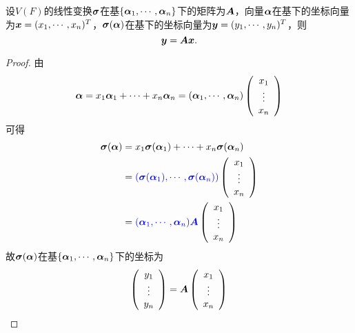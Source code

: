 \begin{frame}
  \begin{dingli}
    设$V(F)$的线性变换$\boldsymbol{\sigma}$在基$\{\boldsymbol{\alpha}_1,\cdots,\boldsymbol{\alpha}_n\}$下的矩阵为$\boldsymbol{A}$，向量$\boldsymbol{\alpha}$在基下的坐标向量为${\boldsymbol{x}}=(x_1,\cdots,x_n)^T$，$\boldsymbol{\sigma}(\boldsymbol{\alpha})$在基下的坐标向量为${\boldsymbol{y}}=(y_1,\cdots,y_n)^T$，则
    $$
    {\boldsymbol{y}}=\boldsymbol{A}{\boldsymbol{x}}.
    $$
  \end{dingli} \vspace{.1in} \pause 

  \begin{proof}
    由
    $$
    \boldsymbol{\alpha}=x_1\boldsymbol{\alpha}_1+\cdots+x_n\boldsymbol{\alpha}_n=(\boldsymbol{\alpha}_1,\cdots,\boldsymbol{\alpha}_n)\left(\begin{array}{c}x_1\\\vdots\\x_n\end{array}\right)
    $$
    可得
    $$
    \begin{aligned}
      \boldsymbol{\sigma}(\boldsymbol{\alpha})&=x_1\boldsymbol{\sigma}(\boldsymbol{\alpha}_1)+\cdots+x_n\boldsymbol{\sigma}(\boldsymbol{\alpha}_n)\\
      &=\textcolor{blue}{(\boldsymbol{\sigma}(\boldsymbol{\alpha}_1),\cdots,\boldsymbol{\sigma}(\boldsymbol{\alpha}_n))}\left(\begin{array}{c}x_1\\\vdots\\x_n\end{array}\right)\\
      &=\textcolor{blue}{(\boldsymbol{\alpha}_1,\cdots,\boldsymbol{\alpha}_n)\boldsymbol{A}}\left(\begin{array}{c}x_1\\\vdots\\x_n\end{array}\right)
    \end{aligned}
    $$
    故$\boldsymbol{\sigma}(\boldsymbol{\alpha})$在基$\{\boldsymbol{\alpha}_1,\cdots,\boldsymbol{\alpha}_n\}$下的坐标为
    $$
    \left(\begin{array}{c}y_1\\\vdots\\y_n\end{array}\right)=\boldsymbol{A}\left(\begin{array}{c}x_1\\\vdots\\x_n\end{array}\right)
    $$
  \end{proof}
\end{frame}


